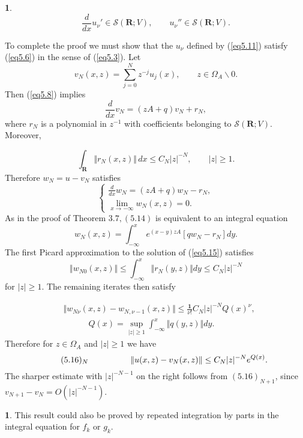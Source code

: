 \documentclass{surv-l}
\theoremstyle{plain}
\theoremstyle{definition}
\newtheorem*{pf}{\sc{Proof}}
\newtheorem{remark}[theorem]{\sc{Remark}}
\numberwithin{equation}{chapter}
\begin{document}
\begin{pf}
\begin{equation}\label{eq5.12}
\frac{d}{dx}u_{\nu}'\in \mathscr{S}(\mathbf{R};V),\qquad u_{\nu}''\in \mathscr{S}(\mathbf{R}; V).
\end{equation}

To complete the proof we must show that the $u_{\nu}$ defined by (\ref{eq5.11}) satisfy (\ref{eq5.6}) in the sense of (\ref{eq5.3}). Let
\begin{equation*}
v_{N}(x, z)=\sum_{j=0}^{N}z^{-j}u_{j}(x),\qquad z\in\Omega_{A}\backslash 0.
\end{equation*}
Then (\ref{eq5.8}) implies
\begin{equation*}
\frac{d}{dx}v_{N}=(zA+q)v_{N}+r_{N},
\end{equation*}
where $r_{N}$ is a polynomial in $z^{-1}$ with coefficients belonging to $\mathscr{S}(\mathbf{R};V)$. Moreover,

\begin{equation}\label{eq5.13}
\int_{\mathbf{R}}\Vert r_{N}(x,z)\Vert\, dx\leq C_{N}|z|^{-N},\qquad |z|\geq 1.
\end{equation}
Therefore $w_{N}=u-v_{N}$ satisfies
\begin{equation}\label{eq5.14}
\left\{\begin{array}{l}
\frac{d}{dx}w_{N}=(zA+q)w_{N}-r_{N},\\
\lim_{x\rightarrow-\infty}w_{N}(x, z)=0.
\end{array}\right.
\end{equation}
As in the proof of Theorem $3.7,(5.14)$ is equivalent to an integral equation
\begin{equation}\label{eq5.15}
w_{N}(x, z)=\int_{-\infty}^{x}e^{(x-y)zA}[qw_{N}-r_{N}]dy.
\end{equation}
The first Picard approximation to the solution of (\ref{eq5.15}) satisfies
\begin{equation*}
\Vert w_{N0}(x, z)\Vert\leq\int_{-\infty}^{x}\Vert r_{N}(y, z)\Vert dy\leq C_{N}|z|^{-N}
\end{equation*}
for $|z|\geq 1$. The remaining iterates then satisfy

\begin{align*}
&\Vert w_{N\nu}(x, z)-w_{N,\nu-1}(x, z)\Vert\leq\frac{\mathbf{1}}{\nu!}C_{N}|z|^{-N}Q(x)^{\nu},\\
&\qquad\quad Q(x)=\sup_{|z|\geq 1}\int_{-\infty}^{x}\Vert q(y, z)\Vert dy.
\end{align*}
Therefore for $z\in\Omega_{A}$ and $|z|\geq 1$ we have
\begin{equation*}
\tag*{$(5.16)_{N}$} \qquad \qquad \quad \Vert u(x,z)-v_{N}(x, z)\Vert\leq C_{N}|z|^{-N}e^{Q(x)}.
\end{equation*}
The sharper estimate with $|z|^{-N-1}$ on the right follows from $(5.16)_{N+1}$, since $v_{N+1}-v_{N}=O(|z|^{-N-1})$.
\end{pf}
\setcounter{theorem}{16}
\begin{remark}\label{chap01:rem5.17}
This result could also be proved by repeated integration by parts in the integral equation for $f_{k}$ or $g_{k}$.
\end{remark}
\end{document}
